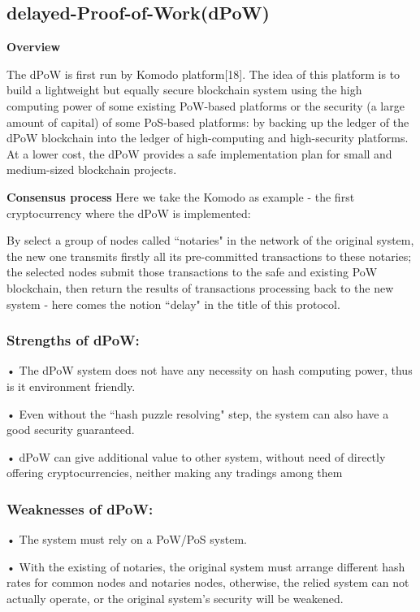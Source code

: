 \documentclass[doublespacing]{bmcart}
\begin{document}
\begin{CJK*}{UTF8}{gbsn}
    \subsection{\textbf{delayed-Proof-of-Work(dPoW)}}
    \textbf{Overview}	
    \par The dPoW is first run by Komodo platform[18]. The idea of this platform is to build a lightweight but equally secure blockchain system using the high computing power of some existing PoW-based platforms or the security (a large amount of capital) of some PoS-based platforms: by backing up the ledger of the dPoW blockchain into the ledger of high-computing and high-security platforms. At a lower cost, the dPoW provides a safe implementation plan for small and medium-sized blockchain projects.
    \par \textbf{Consensus process}
    Here we take the Komodo as example - the first cryptocurrency where the dPoW is implemented:
	\par By select a group of nodes called ``notaries" in the network of the original system, the new one transmits firstly all its pre-committed transactions to these notaries;	the selected nodes submit those transactions to the safe and existing PoW blockchain, then return the results of transactions processing back to the new system - here comes the notion ``delay" in the title of this protocol.
	\subsubsection*{Strengths of dPoW:}		
    • The dPoW system does not have any necessity on hash computing power, thus is it environment friendly.
    \par • Even without the ``hash puzzle resolving" step, the system can also have a good security guaranteed.
    \par • dPoW can give additional value to other system, without need of directly offering cryptocurrencies, neither making any tradings among them
	\subsubsection*{Weaknesses of dPoW:}	
    • The system must rely on a PoW/PoS system.
    \par • With the existing of notaries, the original system must arrange different hash rates for common nodes and notaries nodes, otherwise, the relied system can not actually operate, or the original system’s security will be weakened.
    

\end{CJK*}
\end{document}
